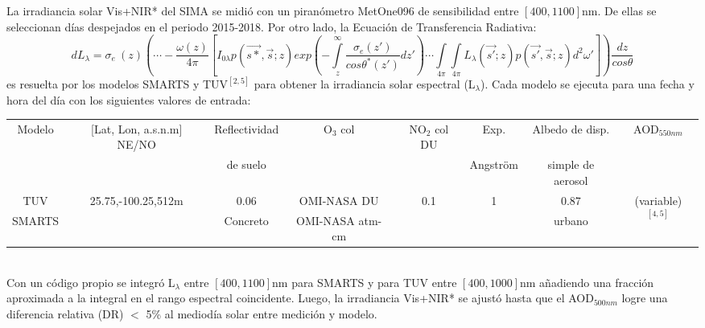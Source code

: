 \documentclass{article}
\begin{document}
\begin{minipage}{0.81\linewidth}
La irradiancia solar Vis+NIR* del SIMA se midió con un piranómetro MetOne096 de sensibilidad entre $\left[400,1100\right]$nm. De ellas se seleccionan días despejados en el periodo 2015-2018. Por otro lado, la Ecuación de Transferencia Radiativa:
\begin{equation*}
dL_{\lambda}=\sigma_e \ \left(z\right) \left(\cdots - \frac{\omega\left(z\right)}{4\pi} \left[I_{0\lambda}p\left(\vec{s*},\vec{s};z \right)exp\left(-\int\limits_z^\infty \frac{\sigma_e(z')}{cos\theta^*(z')}dz' \right)\cdots \int\limits_{4\pi}\int\limits_{4\pi} L_{\lambda}(\vec{s'};z)p(\vec{s'},\vec{s};z)d^2\omega' \right]\right)\frac{dz}{cos\theta}
\end{equation*}
es resuelta por los modelos SMARTS y TUV$^{\left[2,5\right]}$ para obtener la irradiancia solar espectral (L$_\lambda$). Cada modelo se ejecuta para una fecha y hora del día con los siguientes valores de entrada: 

\changefontsizes{9.5pt}
\begin{tabular}{|c|c|c|c|c|c|c|c|}
\hline
  Modelo & [Lat, Lon, a.s.n.m] NE/NO & Reflectividad  & O$_3$ col & NO$_2$ col DU & Exp. & Albedo de disp. & AOD$_{550nm}$ \\
  & & de suelo & & &Angström & simple de aerosol & \\ \hline
 TUV  & \multirow{2}{*}{25.75,-100.25,512m}& 0.06 & OMI-NASA DU & \multirow{2}{*}{0.1} & \multirow{2}{*}{1} & 0.87 & \multirow{2}{*}{(variable)$^{\left[4,5 \right]}$}\\ \cline{1-1}
SMARTS & & Concreto & OMI-NASA atm-cm &  &  & urbano & \\ \hline
\end{tabular}\vspace{0.2cm}\\
\changefontsizes{12pt}
Con un código propio se integró L$_\lambda$ entre $\left[400,1100\right]$nm para SMARTS y para TUV entre $\left[400,1000\right]$nm añadiendo una fracción aproximada a la integral en el rango espectral coincidente. Luego, la irradiancia Vis+NIR* se ajustó hasta que el AOD$_{500nm}$ logre una diferencia relativa (DR) $<$ 5\% al mediodía solar entre medición y modelo.
\end{minipage}
\hspace{0.3cm}
\end{document}
